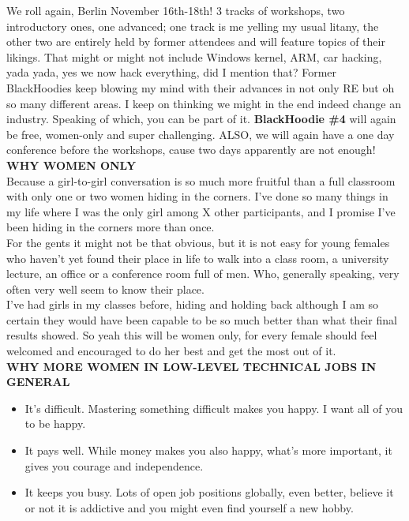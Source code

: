 \def\pagetitletext{BlackHoodie \#4 - rocking as hell}

We roll again, Berlin November 16th-18th! 3 tracks of workshops, two introductory ones, one  advanced; one track is me yelling my usual litany, the other two are entirely held by former attendees and will feature topics of their likings. That might or might not include Windows kernel, ARM, car hacking, yada yada, yes we now hack everything, did I mention that? Former BlackHoodies keep blowing my mind with their advances in not only RE but oh so many different areas. I keep on thinking we might in the end indeed change an industry. Speaking of which, you can be part of it. \textbf{BlackHoodie \#4} will again be free, women-only and super challenging. ALSO, we will again have a one day conference before the workshops, cause two days apparently are not enough!\\

\textbf{WHY WOMEN ONLY} \\

Because a girl-to-girl conversation is so much more fruitful than a full classroom with only one or two women hiding in the corners. I’ve done so many things in my life where I was the only girl among X other participants, and I promise I’ve been hiding in the corners more than once.\\

For the gents it might not be that obvious, but it is not easy for young females who haven’t yet found their place in life to walk into a class room, a university lecture, an office or a conference room full of men. Who, generally speaking, very often very well seem to know their place.\\

I’ve had girls in my classes before, hiding and holding back although I am so certain they would have been capable to be so much better than what their final results showed. So yeah this will be women only, for every female should feel welcomed and encouraged to do her best and get the most out of it.\\

\textbf{WHY MORE WOMEN IN LOW-LEVEL TECHNICAL JOBS IN GENERAL}

\begin{itemize}
	\item It’s difficult. Mastering something difficult makes you happy. I want all of you to be happy.
	\item It pays well. While money makes you also happy, what’s more important, it gives you courage and independence.
	\item It keeps you busy. Lots of open job positions globally, even better, believe it or not it is addictive and you might even find yourself a new hobby.
\end{itemize}

